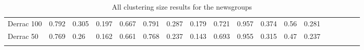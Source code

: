 {\begin{landscape}
\begin{table}[]
\begin{tabular}{lll@{\hskip 0.15in}lllllllllllllll}
		Derrac 100  & 0.792                           & 0.305                           & 0.197                           & 0.667                           & 0.791                           & 0.287                           & 0.179                          & 0.721                           & 0.957                           & 0.374                           & 0.56                            & 0.281               \\
		Derrac 50   & 0.769                           & 0.26                            & 0.162                           & 0.661                           & 0.768                           & 0.237                           & 0.143                          & 0.693                           & 0.955                           & 0.315                           & 0.47                            & 0.237                                     \\
		&                                 &                                 &                                 &                                 &                                 &                                 &                                &                                 &                                 &                                 &                                 &                                                       \\
		
   
	\end{tabular}
\centering
	\caption{All clustering size results for the newsgroups}
\end{table}


\end{landscape}}

